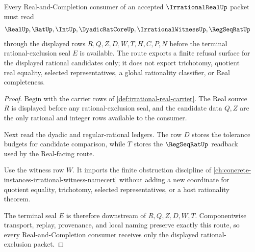 \begin{theorem}
\label{thm:irrational-real-rational-exclusion-route}
Every Real-and-Completion consumer of an accepted $\IrrationalRealUp$ packet must read
$$
\RealUp,\RatUp,\IntUp,\DyadicRatCoreUp,\IrrationalWitnessUp,\RegSeqRatUp
$$
through the displayed rows $R,Q,Z,D,W,T,H,C,P,N$ before the terminal rational-exclusion seal $E$ is available. The route exports a finite refusal surface for the displayed rational candidates only; it does not export trichotomy, quotient real equality, selected representatives, a global rationality classifier, or Real completeness.
\end{theorem}
\begin{proof}
Begin with the carrier rows of \autoref{def:irrational-real-carrier}. The Real source $R$ is displayed before any rational-exclusion seal, and the candidate data $Q,Z$ are the only rational and integer rows available to the consumer.

Next read the dyadic and regular-rational ledgers. The row $D$ stores the tolerance budgets for candidate comparison, while $T$ stores the $\RegSeqRatUp$ readback used by the Real-facing route.

Use the witness row $W$. It imports the finite obstruction discipline of \autoref{ch:concrete-instances-irrational-witness-namecert} without adding a new coordinate for quotient equality, trichotomy, selected representatives, or a host rationality theorem.

The terminal seal $E$ is therefore downstream of $R,Q,Z,D,W,T$. Componentwise transport, replay, provenance, and local naming preserve exactly this route, so every Real-and-Completion consumer receives only the displayed rational-exclusion packet.
\end{proof}




